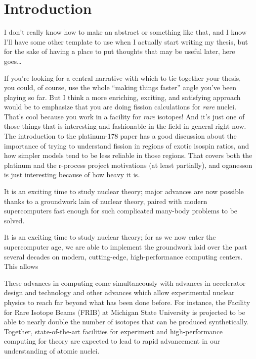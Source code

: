 \chapter{Introduction}\label{chap:Intro}

\maketitle
I don't really know how to make an abstract or something like that, and I know I'll have some other template to use when I actually start writing my thesis, but for the sake of having a place to put thoughts that may be useful later, here goes\dots

If you're looking for a central narrative with which to tie together your thesis, you could, of course, use the whole ``making things faster'' angle you've been playing so far. But I think a more enriching, exciting, and satisfying approach would be to emphasize that you are doing fission calculations for \textit{rare} nuclei. That's cool because you work in a facility for \textit{rare} isotopes! And it's just one of those things that is interesting and fashionable in the field in general right now. The introduction to the platinum-178 paper has a good discussion about the importance of trying to understand fission in regions of exotic isospin ratios, and how simpler models tend to be less reliable in those regions. That covers both the platinum and the r-process project motivations (at least partially), and oganesson is just interesting because of how heavy it is.

It is an exciting time to study nuclear theory; major advances are now possible thanks to a groundwork lain of nuclear theory, paired with modern supercomputers fast enough for such complicated many-body problems to be solved.

It is an exciting time to study nuclear theory; for as we now enter the supercomputer age, we are able to implement the groundwork laid over the past several decades on modern, cutting-edge, high-performance computing centers. This allows 

These advances in computing come simultaneously with advances in accelerator design and technology and other advances which allow experimental nuclear physics to reach far beyond what has been done before. For instance, the Facility for Rare Isotope Beams (FRIB) at Michigan State University is projected to be able to nearly double the number of isotopes that can be produced synthetically. Together, state-of-the-art facilities for experiment and high-performance computing for theory are expected to lead to rapid advancement in our understanding of atomic nuclei.

